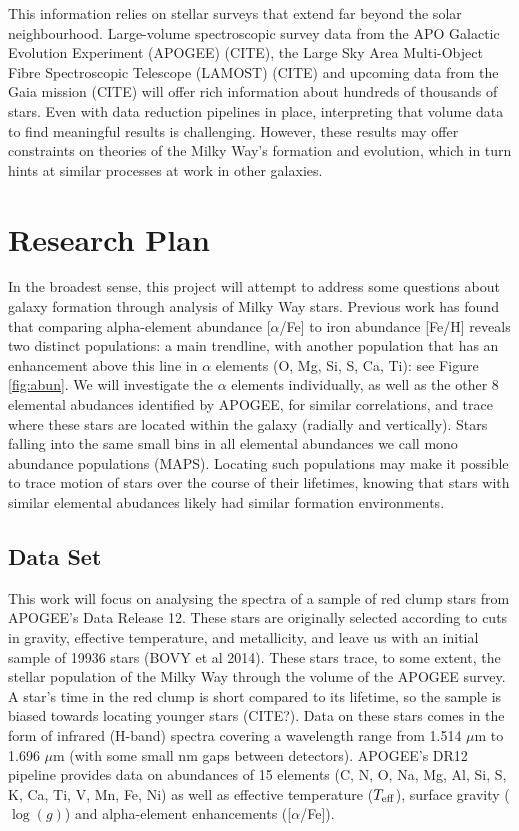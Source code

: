 \documentclass[preprint]{aastex}
\begin{document}
This information relies on stellar surveys that extend far beyond the solar neighbourhood. Large-volume spectroscopic survey data from the APO Galactic Evolution Experiment (APOGEE) (CITE), the Large Sky Area Multi-Object Fibre Spectroscopic Telescope (LAMOST) (CITE) and upcoming data from the Gaia mission (CITE) will offer rich information about hundreds of thousands of stars. Even with data reduction pipelines in place, interpreting that volume data to find meaningful results is challenging. However, these results may offer constraints on theories of the Milky Way's formation and evolution, which in turn hints at similar processes at work in other galaxies.  


\section{Research Plan}
\label{sec:rp}

In the broadest sense, this project will attempt to address some questions about galaxy formation through analysis of Milky Way stars. Previous work \citep{bovy2015} has found that comparing alpha-element abundance [$\alpha$/Fe] to iron abundance [Fe/H] reveals two distinct populations: a main trendline, with another population that has an enhancement above this line in $\alpha$ elements (O, Mg, Si, S, Ca, Ti): see Figure \ref{fig:abun}. We will investigate the $\alpha$ elements individually, as well as the other 8 elemental abudances identified by APOGEE, for similar correlations, and trace where these stars are located within the galaxy (radially and vertically). Stars falling into the same small bins in all elemental abundances we call mono abundance populations (MAPS). Locating such populations may make it possible to trace motion of stars over the course of their lifetimes, knowing that stars with similar elemental abudances likely had similar formation environments.

\subsection{Data Set}
\label{sec:data}
This work will focus on analysing the spectra of a sample of red clump stars from APOGEE's Data Release 12. These stars are originally selected according to cuts in gravity, effective temperature, and metallicity, and leave us with an initial sample of 19936 stars (BOVY et al 2014). These stars trace, to some extent, the stellar population of the Milky Way through the volume of the APOGEE survey. A star's time in the red clump is short compared to its lifetime, so the sample is biased towards locating younger stars (CITE?). Data on these stars comes in the form of infrared (H-band) spectra covering a wavelength range from 1.514 $\mu$m to 1.696 $\mu$m (with some small nm gaps between detectors). APOGEE's DR12 pipeline provides data on abundances of 15 elements (C, N, O, Na, Mg, Al, Si, S, K, Ca, Ti, V, Mn, Fe, Ni) as well as effective temperature ($T_{\rm eff}$), surface gravity ($\log(g)$) and alpha-element enhancements ([$\alpha$/Fe]).
\end{document}
